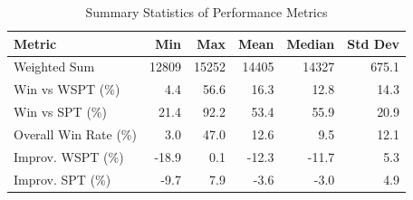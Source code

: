 \begin{table}[htbp]%
\centering%
\begin{tabular}{lrrrrr}%
\toprule%
\textbf{Metric}&\textbf{Min}&\textbf{Max}&\textbf{Mean}&\textbf{Median}&\textbf{Std Dev}\\%
\midrule%
Weighted Sum&12809&15252&14405&14327&675.1\\%
Win vs WSPT (\%)&4.4&56.6&16.3&12.8&14.3\\%
Win vs SPT (\%)&21.4&92.2&53.4&55.9&20.9\\%
Overall Win Rate (\%)&3.0&47.0&12.6&9.5&12.1\\%
Improv. WSPT (\%)&-18.9&0.1&-12.3&-11.7&5.3\\%
Improv. SPT (\%)&-9.7&7.9&-3.6&-3.0&4.9\\%
\bottomrule%
\end{tabular}%
\caption{Summary Statistics of Performance Metrics}%
\label{tab:metrics}%
\end{table}